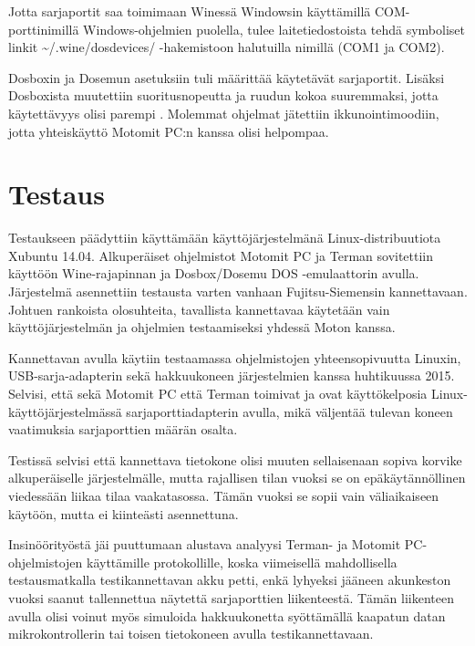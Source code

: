 Jotta sarjaportit saa toimimaan Winessä Windowsin käyttämillä COM-porttinimillä Windows-ohjelmien puolella, tulee laitetiedostoista tehdä symboliset linkit \textasciitilde{}/.wine/dosdevices/ -hakemistoon halutuilla nimillä (COM1 ja COM2).\cite[s. 21]{wine:manual}

Dosboxin ja Dosemun asetuksiin tuli määrittää käytetävät sarjaportit. Lisäksi Dosboxista muutettiin suoritusnopeutta ja ruudun kokoa suuremmaksi, jotta käytettävyys olisi parempi \cite{dosbox:conf}. Molemmat ohjelmat jätettiin ikkunointimoodiin, jotta yhteiskäyttö Motomit PC:n kanssa olisi helpompaa.

\section{Testaus}

Testaukseen päädyttiin käyttämään käyttöjärjestelmänä Linux-distribuutiota Xubuntu 14.04. Alkuperäiset ohjelmistot Motomit PC ja Terman sovitettiin käyttöön Wine-rajapinnan ja Dosbox/Dosemu DOS -emulaattorin avulla. Järjestelmä asennettiin testausta varten vanhaan Fujitsu-Siemensin kannettavaan. Johtuen rankoista olosuhteita, tavallista kannettavaa käytetään vain käyttöjärjestelmän ja ohjelmien testaamiseksi yhdessä Moton kanssa.

Kannettavan avulla käytiin testaamassa ohjelmistojen yhteensopivuutta Linuxin, USB-sarja-adapterin sekä hakkuukoneen järjestelmien kanssa huhtikuussa 2015. Selvisi, että sekä Motomit PC että Terman toimivat ja ovat käyttökelposia Linux-käyttöjärjestelmässä sarjaporttiadapterin avulla, mikä väljentää tulevan koneen vaatimuksia sarjaporttien määrän osalta.

Testissä selvisi että kannettava tietokone olisi muuten sellaisenaan sopiva korvike alkuperäiselle järjestelmälle, mutta rajallisen tilan vuoksi se on epäkäytännöllinen viedessään liikaa tilaa vaakatasossa. Tämän vuoksi se sopii vain väliaikaiseen käytöön, mutta ei kiinteästi asennettuna.

Insinöörityöstä jäi puuttumaan alustava analyysi Terman- ja Motomit PC-ohjelmistojen käyttämille protokollille, koska viimeisellä mahdollisella testausmatkalla testikannettavan akku petti, enkä lyhyeksi jääneen akunkeston vuoksi saanut tallennettua näytettä sarjaporttien liikenteestä. Tämän liikenteen avulla olisi voinut myös simuloida hakkuukonetta syöttämällä kaapatun datan mikrokontrollerin tai toisen tietokoneen avulla testikannettavaan.\newline


